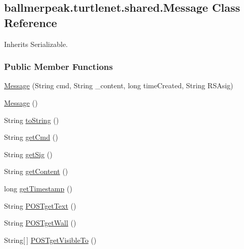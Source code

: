 \hypertarget{classballmerpeak_1_1turtlenet_1_1shared_1_1Message}{\subsection{ballmerpeak.\-turtlenet.\-shared.\-Message Class Reference}
\label{classballmerpeak_1_1turtlenet_1_1shared_1_1Message}
}


Inherits Serializable.

\subsubsection*{Public Member Functions}
\begin{DoxyCompactItemize}
\item 
\hyperlink{classballmerpeak_1_1turtlenet_1_1shared_1_1Message_a041662ab689ade1ea19f62e5cd817ca9}{Message} (String cmd, String \-\_\-content, long time\-Created, String R\-S\-Asig)
\item 
\hyperlink{classballmerpeak_1_1turtlenet_1_1shared_1_1Message_a720cfd084900bae0da46d2d7cc00cc05}{Message} ()
\item 
String \hyperlink{classballmerpeak_1_1turtlenet_1_1shared_1_1Message_aa8740ff71efab8c679bbe843ddb2ece6}{to\-String} ()
\item 
String \hyperlink{classballmerpeak_1_1turtlenet_1_1shared_1_1Message_ab325933a58271b3dfb2248fb0aa5f04a}{get\-Cmd} ()
\item 
String \hyperlink{classballmerpeak_1_1turtlenet_1_1shared_1_1Message_ae53793a87f824fad0a57bdf3ca99b8b2}{get\-Sig} ()
\item 
String \hyperlink{classballmerpeak_1_1turtlenet_1_1shared_1_1Message_af04d03a5ccc6fbf47401869f70202076}{get\-Content} ()
\item 
long \hyperlink{classballmerpeak_1_1turtlenet_1_1shared_1_1Message_a9f05d89ed28e6aff33af41879f867389}{get\-Timestamp} ()
\item 
String \hyperlink{classballmerpeak_1_1turtlenet_1_1shared_1_1Message_a713627f93aca228a3d54e3b7a98fc62c}{P\-O\-S\-Tget\-Text} ()
\item 
String \hyperlink{classballmerpeak_1_1turtlenet_1_1shared_1_1Message_ab1bea6fac3dffdecca7cce5470f7dbf4}{P\-O\-S\-Tget\-Wall} ()
\item 
String\mbox{[}$\,$\mbox{]} \hyperlink{classballmerpeak_1_1turtlenet_1_1shared_1_1Message_a44cac992a0e0a0e71f4467a538faf953}{P\-O\-S\-Tget\-Visible\-To} ()
\item 

\end{DoxyCompactItemize}
